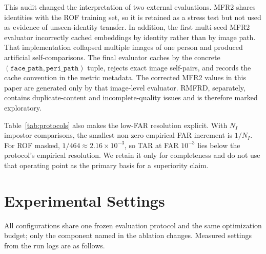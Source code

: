 \documentclass[10pt,journal,compsoc]{IEEEtran}
\begin{document}
This audit changed the interpretation of two external evaluations. MFR2 shares identities with the ROF training set, so it is retained as a stress test but not used as evidence of unseen-identity transfer. In addition, the first multi-seed MFR2 evaluator incorrectly cached embeddings by identity rather than by image path. That implementation collapsed multiple images of one person and produced artificial self-comparisons. The final evaluator caches by the concrete $(\texttt{face\_path},\texttt{peri\_path})$ tuple, rejects exact image self-pairs, and records the cache convention in the metric metadata. The corrected MFR2 values in this paper are generated only by that image-level evaluator. RMFRD, separately, contains duplicate-content and incomplete-quality issues and is therefore marked exploratory.

\begin{table}[t]
\centering
\caption{Evaluation protocols and interpretation after audit.}
\label{tab:protocols}
\end{table}

Table~\ref{tab:protocols} also makes the low-FAR resolution explicit. With $N_I$ impostor comparisons, the smallest non-zero empirical FAR increment is $1/N_I$. For ROF masked, $1/464\approx2.16\times10^{-3}$, so TAR at FAR $10^{-3}$ lies below the protocol's empirical resolution. We retain it only for completeness and do not use that operating point as the primary basis for a superiority claim.

\section{Experimental Settings}
All configurations share one frozen evaluation protocol and the same optimization budget; only the component named in the ablation changes. Measured settings from the run logs are as follows.
\end{document}
